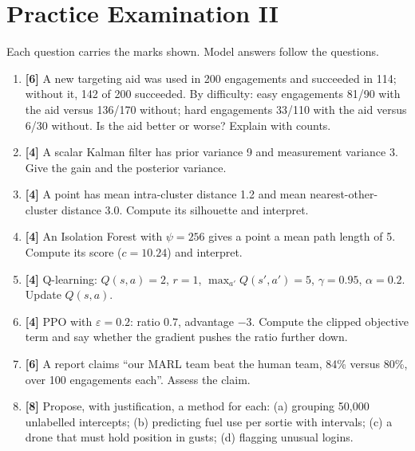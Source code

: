 \documentclass[11pt]{article}
\begin{document}
\section{Practice Examination II}
Each question carries the marks shown. Model answers follow the questions.
\begin{enumerate}
\item \textbf{[6]} A new targeting aid was used in 200 engagements and succeeded in 114; without it, 142 of 200 succeeded. By difficulty: easy engagements 81/90 with the aid versus 136/170 without; hard engagements 33/110 with the aid versus 6/30 without. Is the aid better or worse? Explain with counts.
\item \textbf{[4]} A scalar Kalman filter has prior variance 9 and measurement variance 3. Give the gain and the posterior variance.
\item \textbf{[4]} A point has mean intra-cluster distance 1.2 and mean nearest-other-cluster distance 3.0. Compute its silhouette and interpret.
\item \textbf{[4]} An Isolation Forest with $\psi=256$ gives a point a mean path length of 5. Compute its score ($c=10.24$) and interpret.
\item \textbf{[4]} Q-learning: $Q(s,a)=2$, $r=1$, $\max_{a'}Q(s',a')=5$, $\gamma=0.95$, $\alpha=0.2$. Update $Q(s,a)$.
\item \textbf{[4]} PPO with $\varepsilon=0.2$: ratio $0.7$, advantage $-3$. Compute the clipped objective term and say whether the gradient pushes the ratio further down.
\item \textbf{[6]} A report claims ``our MARL team beat the human team, 84\% versus 80\%, over 100 engagements each''. Assess the claim.
\item \textbf{[8]} Propose, with justification, a method for each: (a) grouping 50,000 unlabelled intercepts; (b) predicting fuel use per sortie with intervals; (c) a drone that must hold position in gusts; (d) flagging unusual logins.
\end{enumerate}
\end{document}
